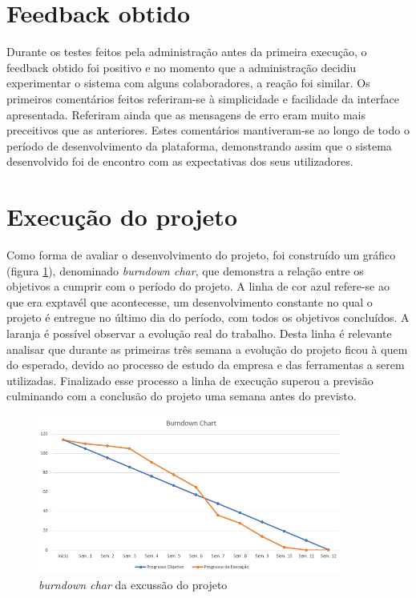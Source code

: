 \section{Feedback obtido}
Durante os testes feitos pela administração antes da primeira execução, o feedback obtido foi positivo e no momento que a administração decidiu experimentar o sistema com alguns colaboradores, a reação foi similar. Os primeiros comentários feitos referiram-se à simplicidade e facilidade da interface apresentada. Referiram ainda que as mensagens de erro eram muito mais preceitivos que as anteriores.
Estes comentários mantiveram-se ao longo de todo o período de desenvolvimento da plataforma, demonstrando assim que o sistema desenvolvido foi de encontro com as expectativas dos seus utilizadores.

\section{Execução do projeto} 
Como forma de avaliar o desenvolvimento do projeto, foi construído um gráfico (figura \ref{fig:burndown_chart}), denominado \textit{burndown char}, que demonstra a relação entre os objetivos a cumprir com o período do projeto. A linha de cor azul refere-se ao que era exptavél que acontecesse, um desenvolvimento constante no qual o projeto é entregue no último dia do período, com todos os objetivos concluídos. A laranja é possível observar a evolução real do trabalho. Desta linha é relevante analisar que durante as primeiras três semana a evolução do projeto ficou à quem do esperado, devido ao processo de estudo da empresa e das ferramentas a serem utilizadas. Finalizado esse processo a linha de execução superou a previsão culminando com a conclusão do projeto uma semana antes do previsto.
\begin{figure}[htbp] 
	\begin{center}
		\includegraphics[width=0.90\textwidth,keepaspectratio]{figuras/burndown_chart.png}
		\caption{\textit{burndown char} da excussão do projeto}
		\label{fig:burndown_chart} 
	\end{center}
\end{figure}